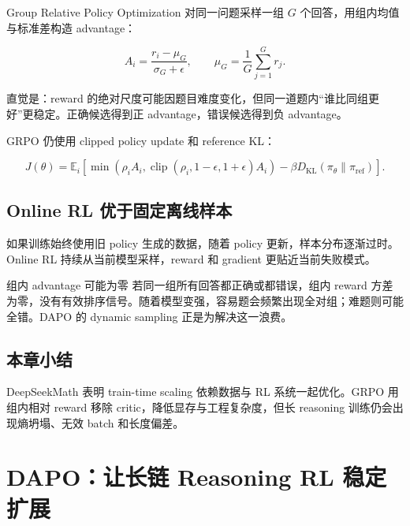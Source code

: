 \documentclass[a4paper]{article}
\begin{document}
Group Relative Policy Optimization 对同一问题采样一组 $G$ 个回答，用组内均值与标准差构造 advantage：

$$
A_i=\frac{r_i-\mu_G}{\sigma_G+\epsilon},
\qquad
\mu_G=\frac{1}{G}\sum_{j=1}^{G}r_j.
$$


直觉是：reward 的绝对尺度可能因题目难度变化，但同一道题内“谁比同组更好”更稳定。正确候选得到正 advantage，错误候选得到负 advantage。

GRPO 仍使用 clipped policy update 和 reference KL：

$$
J(\theta)=\mathbb E_i\left[
\min(\rho_i A_i,\operatorname{clip}(\rho_i,1-\epsilon,1+\epsilon)A_i)
-\beta D_{\mathrm{KL}}(\pi_\theta\|\pi_{\mathrm{ref}})
\right].
$$


\subsection{Online RL 优于固定离线样本}

如果训练始终使用旧 policy 生成的数据，随着 policy 更新，样本分布逐渐过时。Online RL 持续从当前模型采样，reward 和 gradient 更贴近当前失败模式。


\begin{warningbox}{组内 advantage 可能为零}
若同一组所有回答都正确或都错误，组内 reward 方差为零，没有有效排序信号。随着模型变强，容易题会频繁出现全对组；难题则可能全错。DAPO 的 dynamic sampling 正是为解决这一浪费。
\end{warningbox}

\subsection{本章小结}

DeepSeekMath 表明 train-time scaling 依赖数据与 RL 系统一起优化。GRPO 用组内相对 reward 移除 critic，降低显存与工程复杂度，但长 reasoning 训练仍会出现熵坍塌、无效 batch 和长度偏差。

\section{DAPO：让长链 Reasoning RL 稳定扩展}
\end{document}
